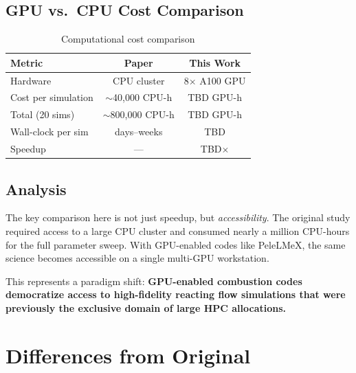 \documentclass[11pt]{article}
\begin{document}
\subsection{GPU vs.\ CPU Cost Comparison}
\begin{table}[H]
\centering
\caption{Computational cost comparison}
\label{tab:cost}
\begin{tabular}{@{}lcc@{}}
\toprule
\textbf{Metric} & \textbf{Paper} & \textbf{This Work} \\
\midrule
Hardware & CPU cluster & 8$\times$ A100 GPU \\
Cost per simulation & $\sim$40,000 CPU-h & \textcolor{oursred}{TBD GPU-h} \\
Total (20 sims) & $\sim$800,000 CPU-h & \textcolor{oursred}{TBD GPU-h} \\
Wall-clock per sim & days--weeks & \textcolor{oursred}{TBD} \\
Speedup & --- & \textcolor{oursred}{TBD$\times$} \\
\bottomrule
\end{tabular}
\end{table}

\subsection{Analysis}
The key comparison here is not just speedup, but \textit{accessibility}. The original study required access to a large CPU cluster and consumed nearly a million CPU-hours for the full parameter sweep. With GPU-enabled codes like PeleLMeX, the same science becomes accessible on a single multi-GPU workstation.

This represents a paradigm shift: \textbf{GPU-enabled combustion codes democratize access to high-fidelity reacting flow simulations that were previously the exclusive domain of large HPC allocations.}

\section{Differences from Original}
\end{document}
